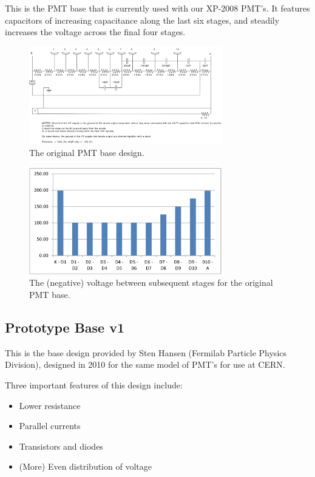 This is the PMT base that is currently used with our XP-2008 PMT's. It features capacitors of increasing capacitance along the last six stages, and steadily increases the voltage across the final four stages.

\begin{figure}[h]
	\centerline{
		\mbox{\includegraphics[width=0.75\textwidth]{figures/pmt.png}}
	}
	\caption{The original PMT base design.}
	\label{fig:original-board}
\end{figure}

\begin{figure}[h]
	\centerline{
		\mbox{\includegraphics[width=0.75\textwidth]{figures/original-volt.jpg}}
	}
	\caption{The (negative) voltage between subsequent stages for the original PMT base.}
	\label{fig:original-volt}
\end{figure}

\subsection{Prototype Base v1}

This is the base design provided by Sten Hansen (Fermilab Particle Physics Division), designed in 2010 for the same model of PMT's for use at CERN. 

Three important features of this design include:

\begin{itemize}
	\item
	Lower resistance
	\item
	Parallel currents
	\item
	Transistors and diodes
	\item
	(More) Even distribution of voltage
\end{itemize}

